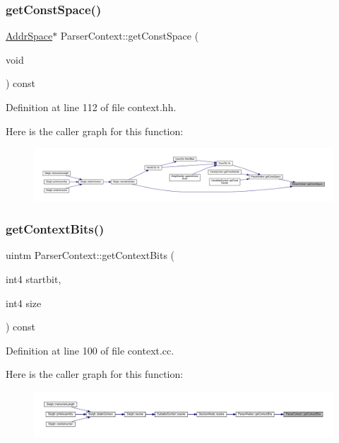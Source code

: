 \subsubsection{\texorpdfstring{getConstSpace()}{getConstSpace()}}
{\footnotesize\ttfamily \mbox{\hyperlink{class_addr_space}{Addr\+Space}}$\ast$ Parser\+Context\+::get\+Const\+Space (\begin{DoxyParamCaption}\item[{void}]{ }\end{DoxyParamCaption}) const\hspace{0.3cm}{\ttfamily [inline]}}



Definition at line 112 of file context.\+hh.

Here is the caller graph for this function\+:
\nopagebreak
\begin{figure}[H]
\begin{center}
\leavevmode
\includegraphics[width=350pt]{class_parser_context_a9dd73c7794a457c62b25d733e8825161_icgraph}
\end{center}
\end{figure}
\mbox{\label{class_parser_context_aa501230fbe7d667d8453f5ccc8d4f8f0}} 
\subsubsection{\texorpdfstring{getContextBits()}{getContextBits()}}
{\footnotesize\ttfamily uintm Parser\+Context\+::get\+Context\+Bits (\begin{DoxyParamCaption}\item[{int4}]{startbit,  }\item[{int4}]{size }\end{DoxyParamCaption}) const}



Definition at line 100 of file context.\+cc.

Here is the caller graph for this function\+:
\nopagebreak
\begin{figure}[H]
\begin{center}
\leavevmode
\includegraphics[width=350pt]{class_parser_context_aa501230fbe7d667d8453f5ccc8d4f8f0_icgraph}
\end{center}
\end{figure}
\mbox{\label{class_parser_context_a9f3ffbc9719247bd2ef63636eff6b0d3}} 
